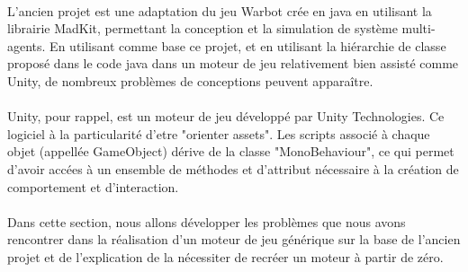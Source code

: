 \documentclass{report}
\begin{document}
\paragraph{}L'ancien projet est une adaptation du jeu Warbot crée en java en utilisant la librairie MadKit, permettant la conception et la simulation de système multi-agents. En utilisant comme base ce projet, et en utilisant la hiérarchie de classe proposé dans le code java dans un moteur de jeu relativement bien assisté comme Unity, de nombreux problèmes de conceptions peuvent apparaître.
\paragraph{}Unity, pour rappel, est un moteur de jeu développé par Unity Technologies. Ce logiciel à la particularité d'etre "orienter assets". Les scripts associé à chaque objet (appellée GameObject) dérive de la classe "MonoBehaviour", ce qui permet d'avoir accées à un ensemble de méthodes et d'attribut nécessaire à la création de comportement et d'interaction.
\paragraph{} Dans cette section, nous allons développer les problèmes que nous avons rencontrer dans la réalisation d'un moteur de jeu générique sur la base de l'ancien projet et de l'explication de la nécessiter de recréer un moteur à partir de zéro.
\end{document}
